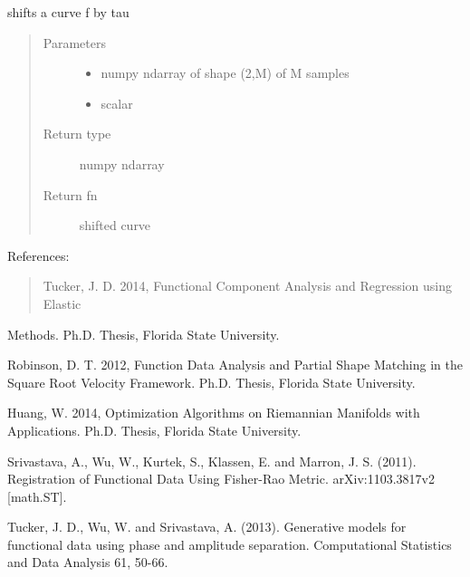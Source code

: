 \documentclass[letterpaper,10pt,english]{sphinxmanual}
\begin{document}

\begin{fulllineitems}
\label{\detokenize{curve_functions:curve_functions.shift_f}}
shifts a curve f by tau
\begin{quote}\begin{description}
\item[{Parameters}] \leavevmode\begin{itemize}
\item {} 
 \textendash{} numpy ndarray of shape (2,M) of M samples

\item {} 
 \textendash{} scalar

\end{itemize}

\item[{Return type}] \leavevmode
numpy ndarray

\item[{Return fn}] \leavevmode
shifted curve

\end{description}\end{quote}

\end{fulllineitems}


References:
\begin{quote}

Tucker, J. D. 2014, Functional Component Analysis and Regression using Elastic
\end{quote}

Methods. Ph.D. Thesis, Florida State University.

Robinson, D. T. 2012, Function Data Analysis and Partial Shape Matching in the
Square Root Velocity Framework. Ph.D. Thesis, Florida State University.

Huang, W. 2014, Optimization Algorithms on Riemannian Manifolds with
Applications. Ph.D. Thesis, Florida State University.

Srivastava, A., Wu, W., Kurtek, S., Klassen, E. and Marron, J. S. (2011).
Registration of Functional Data Using Fisher-Rao Metric. arXiv:1103.3817v2
{[}math.ST{]}.

Tucker, J. D., Wu, W. and Srivastava, A. (2013). Generative models for
functional data using phase and amplitude separation. Computational Statistics
and Data Analysis 61, 50-66.
\end{document}
